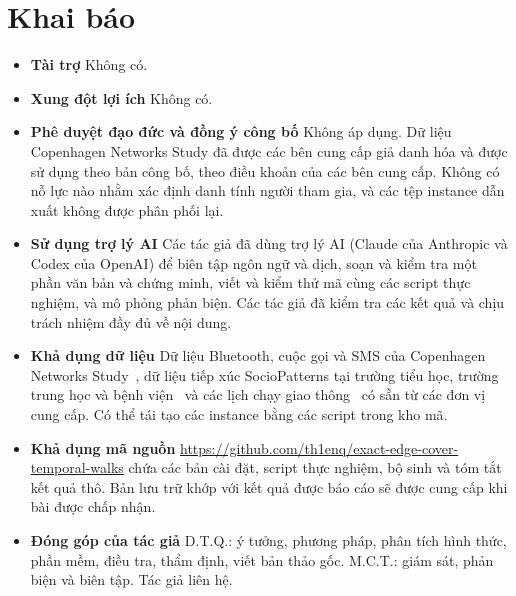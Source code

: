 \documentclass[pdflatex,sn-mathphys-num]{sn-jnl}
\theoremstyle{thmstyleone}
\theoremstyle{thmstyletwo}
\theoremstyle{thmstylethree}
\begin{document}
\section*{Khai báo}
\begin{itemize}
\item \textbf{Tài trợ} Không có.
\item \textbf{Xung đột lợi ích} Không có.
\item \textbf{Phê duyệt đạo đức và đồng ý công bố} Không áp dụng. Dữ liệu Copenhagen Networks Study đã được các bên cung cấp giả danh hóa và được sử dụng theo bản công bố, theo điều khoản của các bên cung cấp. Không có nỗ lực nào nhằm xác định danh tính người tham gia, và các tệp instance dẫn xuất không được phân phối lại.
\item \textbf{Sử dụng trợ lý AI} Các tác giả đã dùng trợ lý AI (Claude của Anthropic và Codex của OpenAI) để biên tập ngôn ngữ và dịch, soạn và kiểm tra một phần văn bản và chứng minh, viết và kiểm thử mã cùng các script thực nghiệm, và mô phỏng phản biện. Các tác giả đã kiểm tra các kết quả và chịu trách nhiệm đầy đủ về nội dung.
\item \textbf{Khả dụng dữ liệu} Dữ liệu Bluetooth, cuộc gọi và SMS của Copenhagen Networks Study~\cite{sapiezynski2019}, dữ liệu tiếp xúc SocioPatterns tại trường tiểu học, trường trung học và bệnh viện~\cite{stehle2011,fournet2014,mastrandrea2015,vanhems2013} và các lịch chạy giao thông~\cite{kujala2018} có sẵn từ các đơn vị cung cấp. Có thể tái tạo các instance bằng các script trong kho mã.
\item \textbf{Khả dụng mã nguồn} \url{https://github.com/th1enq/exact-edge-cover-temporal-walks} chứa các bản cài đặt, script thực nghiệm, bộ sinh và tóm tắt kết quả thô. Bản lưu trữ khớp với kết quả được báo cáo sẽ được cung cấp khi bài được chấp nhận.
\item \textbf{Đóng góp của tác giả} D.T.Q.: ý tưởng, phương pháp, phân tích hình thức, phần mềm, điều tra, thẩm định, viết bản thảo gốc. M.C.T.: giám sát, phản biện và biên tập. Tác giả liên hệ.
\end{itemize}


\end{document}
